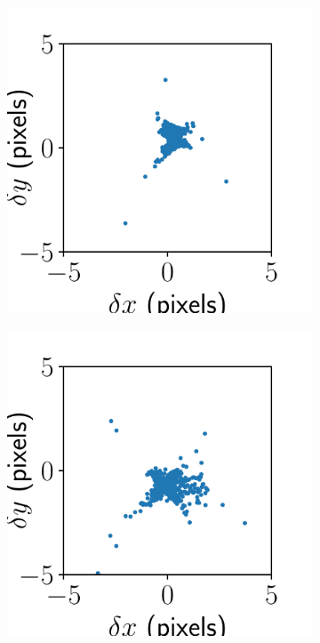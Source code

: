 \documentclass{article}
\begin{document}
\begin{figure}[ht]
	\centering
	\begin{subfigure}{0.24\linewidth}
		\includegraphics[width=\linewidth]{alignment-result-JHUPolaris-4.pdf}
		\caption{}
		\label{fig:alignmentresultJHUPolaris4}
	\end{subfigure}
	\begin{subfigure}{0.24\linewidth}
		\includegraphics[width=\linewidth]{alignment-result-JHUPolaris-3.pdf}

\end{subfigure}
\end{figure}
\end{document}
